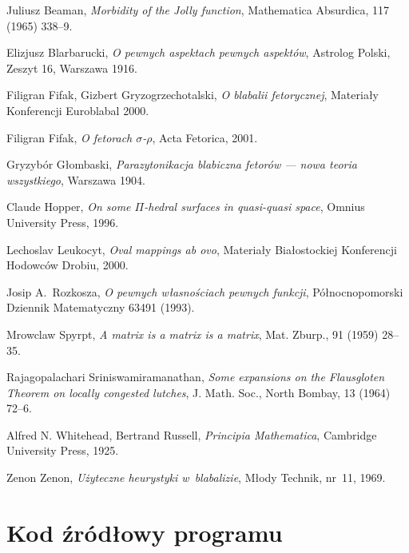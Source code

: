 \documentclass[licencjacka]{pracamgr}
\begin{document}
\begin{thebibliography}{99}

 Juliusz Beaman, \textit{Morbidity of the Jolly
    function}, Mathematica Absurdica, 117 (1965) 338--9.

 Elizjusz Blarbarucki, \textit{O pewnych
    aspektach pewnych aspektów}, Astrolog Polski, Zeszyt 16, Warszawa
  1916.

 Filigran Fifak, Gizbert Gryzogrzechotalski,
  \textit{O blabalii fetorycznej}, Materiały Konferencji Euroblabal
  2000.

 Filigran Fifak, \textit{O fetorach
    $\sigma$-$\rho$}, Acta Fetorica, 2001.

 Gryzybór Głombaski, \textit{Parazytonikacja
    blabiczna fetorów --- nowa teoria wszystkiego}, Warszawa 1904.

 Claude Hopper, \textit{On some $\Pi$-hedral
    surfaces in quasi-quasi space}, Omnius University Press, 1996.

 Lechoslav Leukocyt, \textit{Oval mappings ab ovo},
  Materiały Białostockiej Konferencji Hodowców Drobiu, 2000.

 Josip A.~Rozkosza, \textit{O pewnych własnościach
    pewnych funkcji}, Północnopomorski Dziennik Matematyczny 63491
  (1993).

 Mrowclaw Spyrpt, \textit{A matrix is a matrix
    is a matrix}, Mat. Zburp., 91 (1959) 28--35.

 Rajagopalachari Sriniswamiramanathan,
  \textit{Some expansions on the Flausgloten Theorem on locally
    congested lutches}, J. Math.  Soc., North Bombay, 13 (1964) 72--6.

 Alfred N. Whitehead, Bertrand Russell,
  \textit{Principia Mathematica}, Cambridge University Press, 1925.

 Zenon Zenon, \textit{Użyteczne heurystyki
    w~blabalizie}, Młody Technik, nr~11, 1969.

\end{thebibliography}

\chapter*{Kod źródłowy programu}
\end{document}
